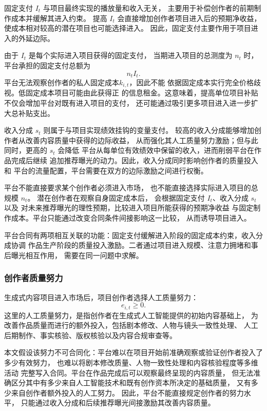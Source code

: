 \documentclass[UTF8, a4paper, 12pt, fontset=fandol]{ctexart}
\theoremstyle{definition}
\theoremstyle{remark}
\begin{document}
固定支付 $I_t$ 与项目最终实现的播放量和收入无关，
主要用于补偿创作者的前期制作成本并缓解其进入约束。
提高 $I_t$ 会直接增加创作者项目进入后的预期净收益，
使成本相对较高的潜在项目也可能选择进入。
因此，固定支付主要作用于项目进入的外延边际。

由于 $I_t$ 是每个实际进入项目获得的固定支付，
当期进入项目的总测度为 $n_t$ 时，平台承担的固定支付总额为
\begin{equation*}
  n_tI_t.
\end{equation*}
平台无法观察创作者的私人固定成本$k_{i,t}$，因此不能
依据固定成本实行完全价格歧视。低固定成本项目可能由此获得正
的信息租金。这意味着，提高单位项目补贴不仅会增加平台对既有进入项目的支付，
还可能通过吸引更多项目进入进一步扩大总补贴支出。

收入分成 $s_t$ 则属于与项目实现绩效挂钩的变量支付。
较高的收入分成能够增加创作者从改善内容质量中获得的边际收益，
从而强化其人工质量努力激励；但与此同时，更高的 $s_t$ 会降低
平台从每单位有效绩效中保留的收入，进而削弱平台在作品完成后继续
追加推荐曝光的动力。因此，收入分成同时影响创作者的质量投入和
平台的流量配置，平台需要在双方的边际激励之间进行权衡。

平台不能直接要求某个创作者必须进入市场，
也不能直接选择实际进入项目的总规模 $n_t$。
潜在创作者在观察自身固定成本后，
会根据固定支付 $I_t$、收入分成 $s_t$ 以及
对未来推荐曝光的理性预期，比较进入项目所能获得的预期净收益
与固定制作成本。平台只能通过改变合同条件间接影响这一比较，
从而诱导项目进入。

平台合同有两项相互关联的功能：固定支付缓解进入阶段的固定成本约束，收入分成协调
作品生产阶段的质量投入激励。二者通过项目进入规模、注意力拥堵和事后曝光相互作用，
需要在同一问题中求解。
\subsubsection{创作者质量努力}
生成式内容项目进入市场后，项目创作者选择人工质量努力：
\begin{equation*}
  e_{i,t} \ge 0.
\end{equation*}
这里的人工质量努力，是指创作者在生成式人工智能提供的初始内容基础上，
为改善作品质量而进行的额外投入，包括剧本修改、人物与镜头一致性处理、
人工后期制作、事实核验、版权核验以及内容合规审查等。

本文假设该努力不可合同化：平台难以在项目开始前准确观察或验证创作者投入了多少有效努力，
也难以将剧本修改质量、人物一致性处理和内容核验程度等多维活动
完整写入合同。平台在作品完成后可以观察最终呈现的内容质量，
但无法准确区分其中有多少来自人工智能技术和既有创作资本所决定的基础质量，
又有多少来自创作者额外投入的人工努力。
因此，平台不能直接规定创作者的努力水平，
只能通过收入分成和后续推荐曝光间接激励其改善内容质量。
\end{document}
